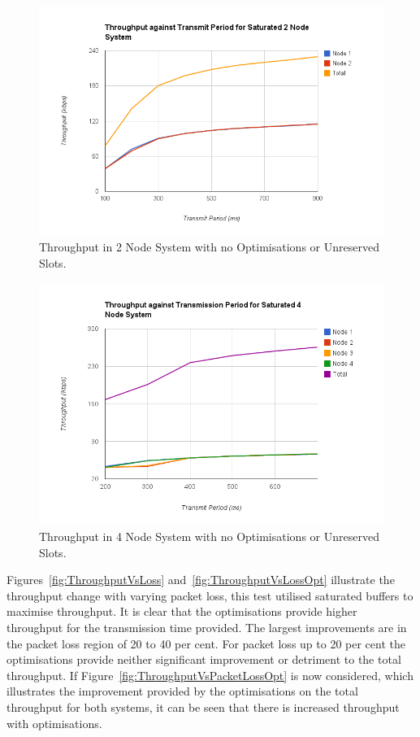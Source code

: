 \documentclass[parskip]{cs4rep}
\begin{document}
\begin{figure}
	\centering
	\includegraphics[width=120mm]{throughputvstransmitperiod2.png}
	\caption{Throughput in 2 Node System with no Optimisations or Unreserved Slots.}
	\label{fig:ThroughputVsTransmitPeriod2}
\end{figure}

\begin{figure}
	\centering
	\includegraphics[width=120mm]{throughputvstransmitperiod4.png}
	\caption{Throughput in 4 Node System with no Optimisations or Unreserved Slots.}
	\label{fig:ThroughputVsTransmitPeriod4}
\end{figure}

Figures~\ref{fig:ThroughputVsLoss} and~\ref{fig:ThroughputVsLossOpt} illustrate the throughput change with varying packet loss, this test utilised saturated buffers to maximise throughput. It is clear that the optimisations provide higher throughput for the transmission time provided. The largest improvements are in the packet loss region of 20 to 40 per cent. For packet loss up to 20 per cent the optimisations provide neither significant improvement or detriment to the total throughput. If Figure~\ref{fig:ThroughputVsPacketLossOpt} is now considered, which illustrates the improvement provided by the optimisations on the total throughput for both systems, it can be seen that there is increased throughput with optimisations.
\end{document}
